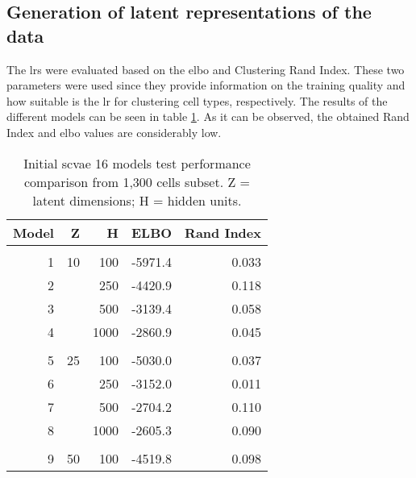 \documentclass{article}
\begin{document}
\subsection{Generation of latent representations of the data}
\label{sec:results_scvae}

\noindent The \glspl{lr} were evaluated based on the \gls{elbo} and Clustering Rand Index.
These two parameters were used since they provide information on the training quality and how suitable is the \gls{lr} for clustering cell types, respectively. 
The results of the different models can be seen in table \ref{tab:16_models}.
As it can be observed, the obtained Rand Index and \gls{elbo} values are considerably low.
\begin{table}[h]
\caption{\small{Initial \gls{scvae} 16 models test performance comparison from 1,300 cells subset. Z = latent dimensions; H = hidden units.}}
\vspace{0.4cm}
\small
\centering
\label{tab:16_models}
\begin{tabular}{rrrrr}
\hline
Model & Z & H & ELBO    & Rand Index \\ \hline
   &                                     &          & &    \\ 
1     & 10                                          & 100          & -5971.4 & 0.033      \\ 
2     &                                           & 250          & -4420.9 & 0.118      \\ 
3     &                                           & 500          & -3139.4 & 0.058      \\ 
4     &                                          & 1000         & -2860.9 & 0.045      \\ 
   &                                     &          & &    \\ 
5     & 25                                          & 100          & -5030.0 & 0.037      \\ 
6     &                                         & 250          & -3152.0 & 0.011      \\ 
7     &                                         & 500          & -2704.2 & 0.110      \\ 
8     &                                         & 1000         & -2605.3 & 0.090      \\ 
   &                                     &          & &    \\ 
9     & 50                                          & 100          & -4519.8 & 0.098      \\ 

\end{tabular}
\end{table}
\end{document}
